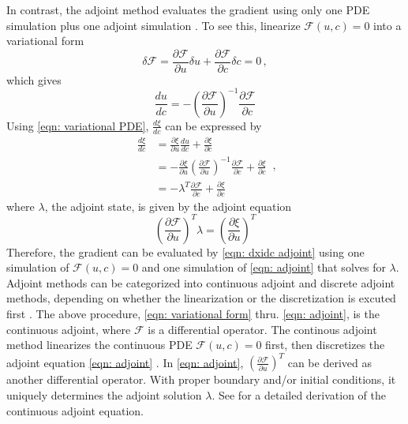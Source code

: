 In contrast, the adjoint method evaluates the gradient using only one PDE simulation
plus one adjoint simulation
\cite{adjoint}.
To see this, linearize $\mathcal{F}(u,c)=0$ into a variational form
\begin{equation}
    \delta \mathcal{F} = \frac{\partial \mathcal{F}}{\partial u} \delta u + \frac{\partial \mathcal{F}}{\partial c} \delta c = 0\,,
\label{eqn: variational form}
\end{equation}
which gives
\begin{equation}
    \frac{du}{dc} = - \left(\frac{\partial \mathcal{F}}{\partial u}\right)^{-1} \frac{\partial \mathcal{F}}{\partial c}
    \label{eqn: variational PDE}
\end{equation}
Using \eqref{eqn: variational PDE}, $\frac{d\xi}{dc}$ can be expressed by
\begin{equation}\begin{split}
    \frac{d\xi}{dc} &= \frac{\partial \xi}{\partial u}\frac{du}{dc} + \frac{\partial \xi}{\partial c}\\
    &= - \frac{\partial \xi}{\partial u} \left(\frac{\partial \mathcal{F}}{\partial u}\right)^{-1}
       \frac{\partial \mathcal{F}}{\partial c} + \frac{\partial \xi}{\partial c}\\
    &= - \lambda^T \frac{\partial \mathcal{F}}{\partial c} + \frac{\partial \xi}{\partial c}
\end{split}
\,,
    \label{eqn: dxidc adjoint}
\end{equation}
where $\lambda$, the adjoint state, is given by the adjoint equation
\begin{equation}
    \left(\frac{\partial \mathcal{F}}{\partial u}\right)^T \lambda = \left(\frac{\partial \xi}{\partial u}\right)^T
    \label{eqn: adjoint}
\end{equation}
Therefore, the gradient can be evaluated by \eqref{eqn: dxidc adjoint}
using one simulation of $\mathcal{F}(u,c)=0$ and one simulation of \eqref{eqn: adjoint} that 
solves for $\lambda$. \\

Adjoint methods can be categorized into continuous adjoint and discrete adjoint methods,
depending on whether the linearization or the discretization is excuted first \cite{review adjoint geo}.
The above procedure, \eqref{eqn: variational form} thru. \eqref{eqn: adjoint},
is the continuous adjoint,
where $\mathcal{F}$ is a differential operator.
The continous adjoint method linearizes the continuous PDE $\mathcal{F}(u,c) = 0$ first,
then discretizes the adjoint equation 
\eqref{eqn: adjoint} \cite{adjoint}. 
In \eqref{eqn: adjoint}, 
$\left(\frac{\partial \mathcal{F}}{\partial u}\right)^T$ can
be derived as another differential operator. With proper boundary and/or initial
conditions, it uniquely determines the adjoint solution $\lambda$. See \cite{intro adjoint}
for a detailed derivation of the continuous adjoint equation.\\

